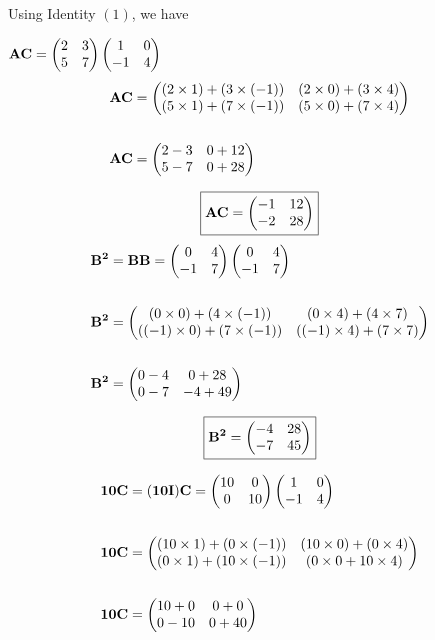 \documentclass[journal,12pt,twocolumn]{IEEEtran}
\begin{document}
    Using Identity $(1)$, we have

    $
      \mathbf{AC}=
     \begin{pmatrix} 
        2 & 3 \\
        5 & 7
      \end{pmatrix} 
     \begin{pmatrix} 
        1 & 0 \\
        -1 & 4
      \end{pmatrix} 
      $
      \begin{align*}
      \mathbf{AC}&=
     \begin{pmatrix} 
        (2\times1)+(3\times(-1)) & (2\times0)+(3\times4) \\
        (5\times1)+(7\times(-1)) & (5\times0)+(7\times4)
      \end{pmatrix} 
      \\
      \\
      \mathbf{AC}&=
     \begin{pmatrix} 
        2-3 & 0+12 \\
        5-7 & 0+28
      \end{pmatrix} 
      \end{align*}

      \begin{equation}
        \boxed{\mathbf{AC}=
       \begin{pmatrix} 
          -1 & 12 \\
          -2 & 28 
        \end{pmatrix} 
        }
      \end{equation}  
    \begin{align*}
      \mathbf{B^2}&=\mathbf{BB}
      =
     \begin{pmatrix} 
        0 & 4 \\
        -1 & 7
      \end{pmatrix} 
     \begin{pmatrix} 
        0 & 4 \\
        -1 & 7
      \end{pmatrix} 
    \\
    \\
      \mathbf{B^2}&=
     \begin{pmatrix} 
        (0\times0)+(4\times(-1)) & (0\times4)+(4\times7) \\
        ((-1)\times0)+(7\times(-1)) & ((-1)\times4)+(7\times7)
      \end{pmatrix} 
      \\ 
      \\
       \mathbf{B^2}&=
     \begin{pmatrix} 
        0-4 & 0+28 \\
        0-7 & -4+49
      \end{pmatrix} 
    \end{align*}

      \begin{equation}
      \boxed{\mathbf{B^2}=
     \begin{pmatrix} 
        -4 & 28 \\
        -7 & 45 
      \end{pmatrix} 
      }
    \end{equation}
    
      \begin{align*}
      \mathbf{10C}&=\mathbf{(10I)C} =
     \begin{pmatrix} 
        10 & 0 \\
        0 & 10
      \end{pmatrix} 
     \begin{pmatrix} 
        1 & 0 \\
        -1 & 4
      \end{pmatrix} 
        \\
        \\
      \mathbf{10C}&=
     \begin{pmatrix} 
        (10\times1)+(0\times(-1)) & (10\times0)+(0\times4) \\
        (0\times1)+(10\times(-1)) & (0\times0+10\times4)
      \end{pmatrix} 
        \\
        \\
      \mathbf{10C}&=
     \begin{pmatrix} 
        10+0 & 0+0 \\
        0-10 & 0+40
      \end{pmatrix} 
      \end{align*}
\end{document}
